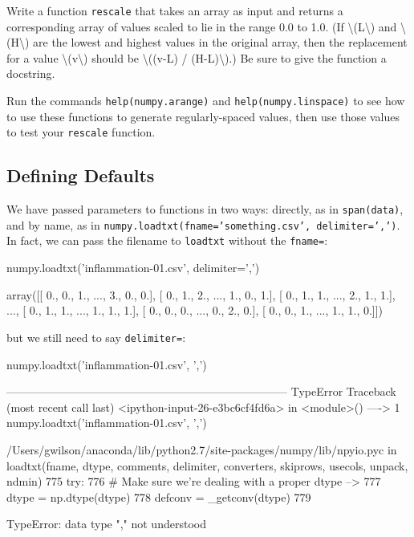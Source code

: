 \begin{challenge}
  Write a function \texttt{rescale} that takes an array as input and
  returns a corresponding array of values scaled to lie in the range 0.0
  to 1.0. (If \textbackslash{}(L\textbackslash{}) and
  \textbackslash{}(H\textbackslash{}) are the lowest and highest values
  in the original array, then the replacement for a value
  \textbackslash{}(v\textbackslash{}) should be \textbackslash{}((v-L) /
  (H-L)\textbackslash{}).) Be sure to give the function a docstring.
\end{challenge}

\begin{challenge}
  Run the commands \texttt{help(numpy.arange)} and
  \texttt{help(numpy.linspace)} to see how to use these functions to
  generate regularly-spaced values, then use those values to test your
  \texttt{rescale} function.
\end{challenge}

\subsection{Defining Defaults}

We have passed parameters to functions in two ways: directly, as in
\texttt{span(data)}, and by name, as in
\texttt{numpy.loadtxt(fname='something.csv', delimiter=',')}. In fact,
we can pass the filename to \texttt{loadtxt} without the
\texttt{fname=}:

\begin{VerbIn}
numpy.loadtxt('inflammation-01.csv', delimiter=',')
\end{VerbIn}

\begin{VerbOut}
array([[ 0.,  0.,  1., ...,  3.,  0.,  0.],
       [ 0.,  1.,  2., ...,  1.,  0.,  1.],
       [ 0.,  1.,  1., ...,  2.,  1.,  1.],
       ...,
       [ 0.,  1.,  1., ...,  1.,  1.,  1.],
       [ 0.,  0.,  0., ...,  0.,  2.,  0.],
       [ 0.,  0.,  1., ...,  1.,  1.,  0.]])
\end{VerbOut}

but we still need to say \texttt{delimiter=}:

\begin{VerbIn}
numpy.loadtxt('inflammation-01.csv', ',')
\end{VerbIn}

\begin{VerbErr}
---------------------------------------------------------------------------
TypeError                                 Traceback (most recent call last)
<ipython-input-26-e3bc6cf4fd6a> in <module>()
----> 1 numpy.loadtxt('inflammation-01.csv', ',')

/Users/gwilson/anaconda/lib/python2.7/site-packages/numpy/lib/npyio.pyc in loadtxt(fname, dtype, comments, delimiter, converters, skiprows, usecols, unpack, ndmin)
    775     try:
    776         # Make sure we're dealing with a proper dtype
--> 777         dtype = np.dtype(dtype)
    778         defconv = _getconv(dtype)
    779

TypeError: data type "," not understood
\end{VerbErr}

